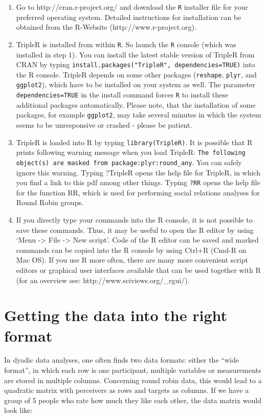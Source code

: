 \documentclass[a4paper]{article}\usepackage[]{graphicx}\usepackage[]{color}
\begin{document}
\begin{enumerate}
	\item Go to http://cran.r-project.org/ and download the \texttt{R} installer file for your preferred operating system. Detailed instructions for installation can be obtained from the R-Website (http://www.r-project.org).
	\item TripleR is installed from within \texttt{R}. So launch the \texttt{R} console (which was installed in step 1). You can install the latest stable version of TripleR from CRAN by typing \texttt{install.packages("TripleR", dependencies=TRUE)} into the R console. TripleR depends on some other packages (\texttt{reshape}, \texttt{plyr}, and \texttt{ggplot2}), which have to be installed on your system as well. The parameter \texttt{dependencies=TRUE} in the install command forces \texttt{R} to install these additional packages automatically. Please note, that the installation of some packages, for example \texttt{ggplot2}, may take several minutes in which the system seems to be unresponsive or crashed - please be patient.
	\item TripleR is loaded into R by typing \texttt{library(TripleR)}. It is possible that R prints following warning message when you load TripleR: \texttt{The following object(s) are masked from package:plyr:round\_any}. You can safely ignore this warning. Typing ?TripleR opens the help file for TripleR, in which you find a link to this pdf among other things. Typing \texttt{?RR} opens the help file for the function RR, which is used for performing social relations analyses for Round Robin groups. 
	\item If you directly type your commands into the R console, it is not possible to save these commands. Thus, it may be useful to open the R editor by using `Menu -> File -> New script'. Code of the R editor can be saved and marked commands can be copied into the R console by using Ctrl+R (Cmd-R on Mac OS). If you use R more often, there are many more convenient script editors or graphical user interfaces available that can be used together with R (for an overview see: http://www.sciviews.org/\_rgui/).
\end{enumerate}
 




\section{Getting the data into the right format} 
In dyadic data analyses, one often finds two data formats: either the ``wide format'', in which each row is one participant, multiple variables or measurements are stored in multiple columns. Concerning round robin data, this would lead to a quadratic matrix with perceivers as rows and targets as columns. If we have a group of 5 people who rate how much they like each other, the data matrix would look like:
\end{document}
